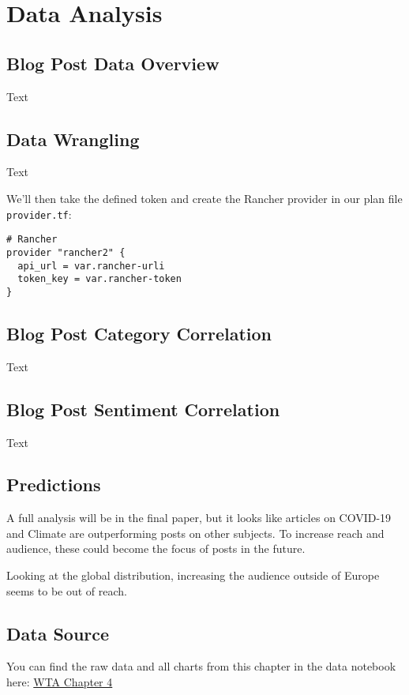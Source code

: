%
%

\pagebreak
\section{Data Analysis}

\onehalfspacing

\subsection{Blog Post Data Overview}

Text

\subsection{Data Wrangling}

Text

We'll then take the defined token and create the Rancher provider in our plan file \verb|provider.tf|:

\begin{lstlisting}[caption=Rancher Provider, frame=single, basicstyle=\ttfamily]
# Rancher
provider "rancher2" {
  api_url = var.rancher-urli
  token_key = var.rancher-token
}
\end{lstlisting}

\subsection{Blog Post Category Correlation}

Text 

\subsection{Blog Post Sentiment Correlation}

Text

\subsection{Predictions}

A full analysis will be in the final paper, but it looks like articles on COVID-19 and Climate are outperforming posts on other subjects. To increase reach and audience, these could become the focus of posts in the future.

Looking at the global distribution, increasing the audience outside of Europe seems to be out of reach.

\subsection{Data Source}

You can find the raw data and all charts from this chapter in the data notebook here: \href{https://plausible.io/chfrank.net}{WTA Chapter 4}
